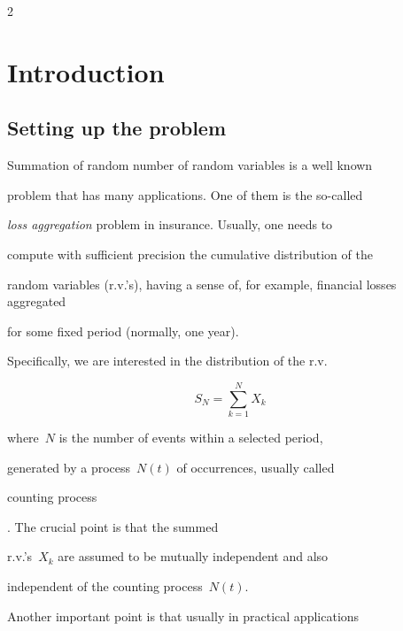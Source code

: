       \begin{multicols}{2}



      \label{st\stat}



\section{Introduction}





\subsection{Setting up the problem}



\noindent

Summation of random number of random variables is a well known

problem that has many applications. One of them is the so-called

{\it loss aggregation} problem in insurance. Usually, one needs to

compute with sufficient precision the cumulative distribution of the

random variables (r.v.'s), having a sense of, for example, financial losses aggregated

for some fixed period (normally, one year).





Specifically, we are interested in the distribution of the r.v.

\begin{equation}

\label{firstSum}

S_{N}=\sum\limits_{k=1}^{N}X_k

\end{equation}

where~$N$ is the number of events within a selected period,

generated by a process~$N(t)$ of occurrences, usually called {\it

counting process}. The crucial point is that the summed

r.v.'s~$X_k$ are assumed to be mutually independent and also

independent of the counting process~$N(t)$.



Another important point is that usually in practical applications


\end{multicols}
